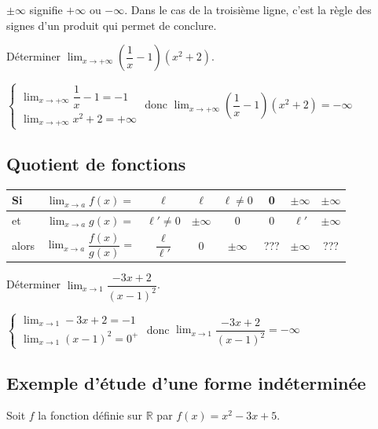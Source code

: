 \documentclass[french]{book}
\newcommand{\R}{\mathbb {R}}
\newcommand{\ds}{\displaystyle}
\newcommand{\limite}[2][x]{\ds\lim_{#1\rightarrow #2}}
\newcommand{\limpinf}[1][x]{\ds\lim_{#1\rightarrow +\infty}}
\begin{document}
\begin{rem}
$\pm\infty$ signifie $+\infty$ ou $-\infty$. Dans le cas de la troisi\`eme ligne, c'est la r\`egle des signes d'un produit qui permet de conclure.
\end{rem}

\begin{exemple}
D\'eterminer $\limpinf \left(\dfrac{1}{x}-1\right)(x^{2}+2)$.
\end{exemple}


$\left\lbrace
\begin{array}{l}
\limpinf \dfrac{1}{x}-1=-1 \\
\limpinf x^{2}+2=+\infty
\end{array}
\right.$
donc $\limpinf \left(\dfrac{1}{x}-1\right)(x^{2}+2)=-\infty$


\subsection{Quotient de fonctions}
\begin{center}
\renewcommand{\arraystretch}{2}
\begin{tabular}{|lc|c|c|c|c|c|c|} \hline
Si & $\limite[x]{a}f(x)=$ & $\ell$ & $\ell$ & $\ell\neq0$ & 0 & $\pm\infty$ & $\pm\infty$ \\ \hline
et & $\limite[x]{a}g(x)=$ & $\ell'\neq0$ & $\pm\infty$ & 0 & 0 & $\ell'$ & $\pm\infty$ \\ \hline
alors & $\limite[x]{a}\dfrac{f(x)}{g(x)}=$ & $\dfrac{\ell}{\ell'}$ & 0 & $\pm\infty$ & ??? & $\pm\infty$ & ??? \\ \hline
\end{tabular}
\end{center}

\begin{exemple}
D\'eterminer $\limite[x]{1}\dfrac{-3x+2}{(x-1)^{2}}$.
\end{exemple}


$\left\lbrace
\begin{array}{l}
\limite[x]{1}-3x+2=-1 \\
\limite[x]{1}(x-1)^{2}=0^{+}
\end{array}
\right.$
donc $\limite[x]{1}\dfrac{-3x+2}{(x-1)^{2}}=-\infty$

\subsection{Exemple d'\'etude d'une forme ind\'etermin\'ee}
Soit $f$ la fonction d\'efinie sur $\R$ par $f(x)=x^{2}-3x+5$.
\end{document}
